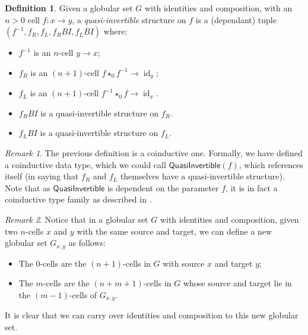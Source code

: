 \documentclass{article}
\theoremstyle{definition}
\newtheorem{definition}{Definition}
\theoremstyle{remark}
\newtheorem{remark}{Remark}
\DeclareMathOperator{\id}{id}
\newcommand{\inv}[1]{#1^{-1}}
\newcommand{\comp}{\star}
\begin{document}
\begin{definition}
  Given a globular set \(G\) with identities and composition, with an \(n > 0\) cell \(f : x \to y\), a \emph{quasi-invertible} structure on \(f\) is a (dependant) tuple \((\inv f, f_R, f_L, f_R{}BI, f_L{}BI)\) where:
  \begin{itemize}
  \item \(\inv f\) is an \(n\)-cell \(y \to x\);
  \item \(f_R\) is an \((n+1)\)-cell \(f \comp_0 \inv f \to \id_y\);
  \item \(f_L\) is an \((n+1)\)-cell \(\inv f \comp_0 f \to \id_x\).
  \item \(f_R{}BI\) is a quasi-invertible structure on \(f_R\).
  \item \(f_L{}BI\) is a quasi-invertible structure on \(f_L\).
  \end{itemize}
\end{definition}

\begin{remark}
  The previous definition is a coinductive one. Formally, we have defined a coinductive data type, which we could call \(\mathsf{QuasiInvertible}(f)\), which references itself (in saying that \(f_R\) and \(f_L\) themselves have a quasi-invertible structure). Note that as \(\mathsf{QuasiInvertible}\) is dependent on the parameter \(f\), it is in fact a coinductive type family as described in .
\end{remark}

\begin{remark}\label{descendants}
  Notice that in a globular set \(G\) with identities and composition, given two \(n\)-cells \(x\) and \(y\) with the same source and target, we can define a new globular set \(G_{x,y}\) as follows:
  \begin{itemize}
  \item The \(0\)-cells are the \((n+1)\)-cells in \(G\) with source \(x\) and target \(y\);
  \item The \(m\)-cells are the \((n+m+1)\)-cells in \(G\) whose source and target lie in the \((m-1)\)-cells of \(G_{x,y}\).
  \end{itemize}
  It is clear that we can carry over identities and composition to this new globular set.
\end{remark}
\end{document}
